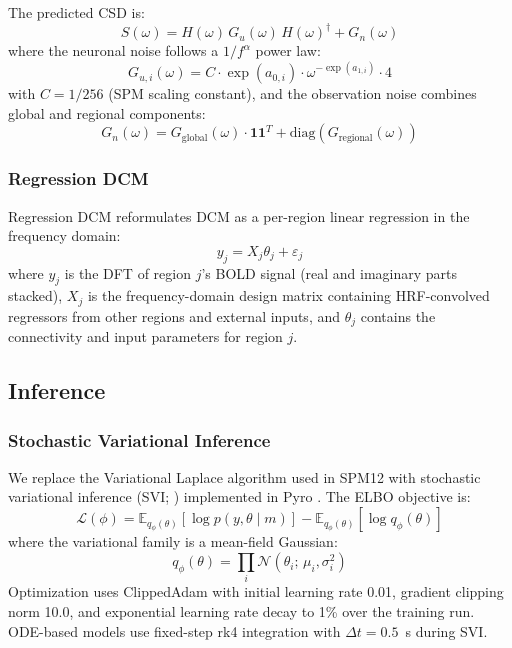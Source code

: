 The predicted CSD is:
\begin{equation}
  S(\omega) = H(\omega)\, G_u(\omega)\, H(\omega)^\dagger + G_n(\omega)
  \label{eq:predicted-csd}
\end{equation}
where the neuronal noise follows a $1/f^\alpha$ power law:
\begin{equation}
  G_{u,i}(\omega) = C \cdot \exp(a_{0,i}) \cdot \omega^{-\exp(a_{1,i})} \cdot 4
  \label{eq:neuronal-noise}
\end{equation}
with $C = 1/256$ (SPM scaling constant), and the observation noise
combines global and regional components:
\begin{equation}
  G_n(\omega) = G_\text{global}(\omega) \cdot \mathbf{1}\mathbf{1}^T
    + \text{diag}(G_\text{regional}(\omega))
  \label{eq:obs-noise}
\end{equation}

\subsubsection{Regression DCM}

Regression DCM \citep{frassle2017} reformulates DCM as a per-region
linear regression in the frequency domain:
\begin{equation}
  y_j = X_j \theta_j + \varepsilon_j
  \label{eq:rdcm-regression}
\end{equation}
where $y_j$ is the DFT of region $j$'s BOLD signal (real and imaginary
parts stacked), $X_j$ is the frequency-domain design matrix containing
HRF-convolved regressors from other regions and external inputs, and
$\theta_j$ contains the connectivity and input parameters for region $j$.

\subsection{Inference}

\subsubsection{Stochastic Variational Inference}

We replace the Variational Laplace algorithm used in SPM12
\citep{friston2007vfe} with stochastic variational inference (SVI;
\citealp{blei2017}) implemented in Pyro \citep{bingham2019}. The ELBO
objective is:
\begin{equation}
  \mathcal{L}(\phi)
    = \mathbb{E}_{q_\phi(\theta)}
      \left[ \log p(y, \theta \mid m) \right]
    - \mathbb{E}_{q_\phi(\theta)}
      \left[ \log q_\phi(\theta) \right]
  \label{eq:elbo}
\end{equation}
where the variational family is a mean-field Gaussian:
\begin{equation}
  q_\phi(\theta) = \prod_i \mathcal{N}(\theta_i;\, \mu_i, \sigma_i^2)
  \label{eq:mean-field}
\end{equation}
Optimization uses ClippedAdam with initial learning rate 0.01, gradient
clipping norm 10.0, and exponential learning rate decay to 1\% over the
training run. ODE-based models use fixed-step rk4 integration with
$\Delta t = 0.5$~s during SVI.

